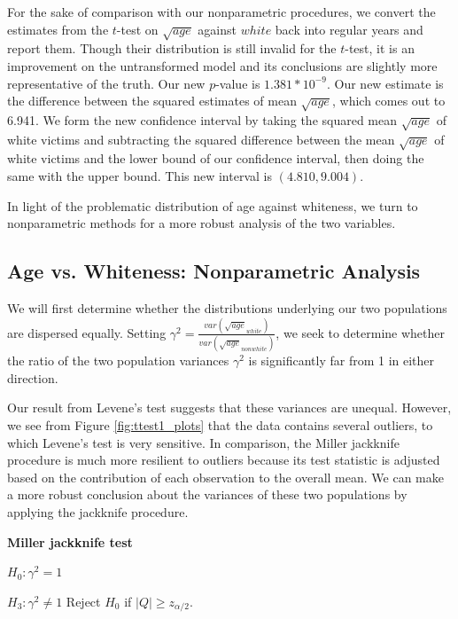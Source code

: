 \par For the sake of comparison with our nonparametric procedures, we convert the estimates from the $t$-test on $\sqrt{age}$ against $white$ back into regular years and report them. Though their distribution is still invalid for the $t$-test, it is an improvement on the untransformed model and its conclusions are slightly more representative of the truth. Our new $p$-value is $1.381*10^{-9}$. Our new estimate is the difference between the squared estimates of mean $\sqrt{age}$, which comes out to 6.941. We form the new confidence interval by taking the squared mean $\sqrt{age}$ of white victims and subtracting the squared difference between the mean $\sqrt{age}$ of white victims and the lower bound of our confidence interval, then doing the same with the upper bound. This new interval is $(4.810, 9.004)$.

\par \bigskip In light of the problematic distribution of age against whiteness, we turn to nonparametric methods for a more robust analysis of the two variables.

\subsection{Age vs. Whiteness: Nonparametric Analysis}

\par \bigskip We will first determine whether the distributions underlying our two populations are dispersed equally. Setting $\gamma^2 = \frac{var({\sqrt{age}}_{white})}{var({\sqrt{age}}_{nonwhite})}$, we seek to determine whether the ratio of the two population variances $\gamma^2$ is significantly far from 1 in either direction.

\par \bigskip Our result from Levene's test suggests that these variances are unequal. However, we see from Figure \ref{fig:ttest1_plots} that the data contains several outliers, to which Levene's test is very sensitive. In comparison, the Miller jackknife procedure is much more resilient to outliers because its test statistic is adjusted based on the contribution of each observation to the overall mean. We can make a more robust conclusion about the variances of these two populations by applying the jackknife procedure.

\bigskip \textbf{Miller jackknife test}

\bigskip $H_0: \gamma^2 = 1$

$H_3: \gamma^2 \not= 1$ \hspace{1in} Reject $H_0$ if $|Q| \ge z_{\alpha/2}$.


